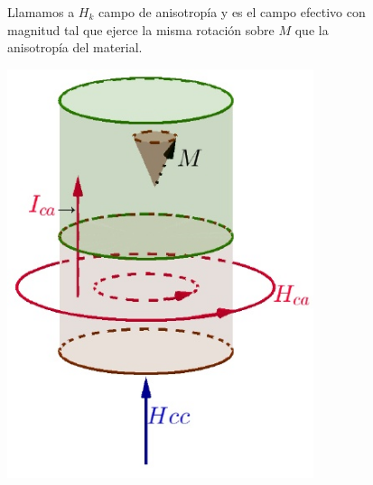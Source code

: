 \begin{figure}[H]
  \begin{minipage}[b]{0.47\textwidth}
Llamamos a $H_{k}$ campo de anisotropía y es el campo efectivo con magnitud tal que
ejerce la misma rotación sobre $M$ que la anisotropía del material.
  \vspace{2cm}
  \end{minipage}
  \hfill
  \begin{minipage}[b]{0.47\textwidth}
     \includegraphics[width=0.8\textwidth]{./Figures/fig328}
	\label{fig:328}
  \end{minipage}
\end{figure}

